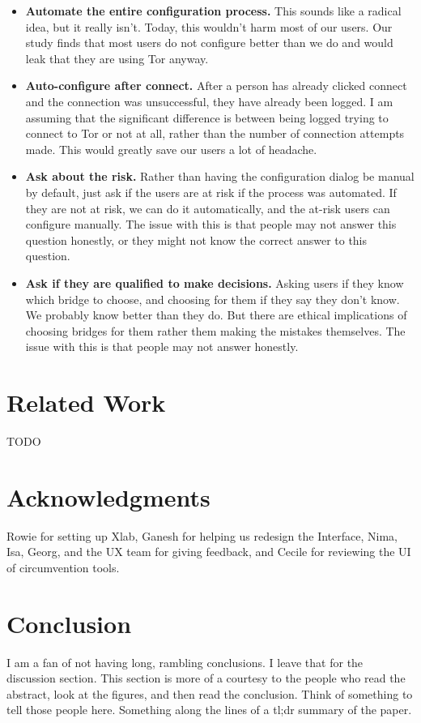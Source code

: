 \documentclass[USenglish,oneside,twocolumn]{article}
\begin{document}
\begin{itemize}
\item{\bfseries Automate the entire configuration process.} This sounds like a radical idea, but it really isn't. Today, this wouldn't harm most of our users. Our study finds that most users do not configure better than we do and would leak that they are using Tor anyway. 
\item {\bfseries Auto-configure after connect.} After a person has already clicked connect and the connection was unsuccessful, they have already been logged. I am assuming that the significant difference is between being logged trying to connect to Tor or not at all, rather than the number of connection attempts made. This would greatly save our users a lot of headache. 
\item{\bfseries Ask about the risk.} Rather than having the configuration dialog be manual by default, just ask if the users are at risk if the process was automated. If they are not at risk, we can do it automatically, and the at-risk users can configure manually. The issue with this is that people may not answer this question honestly, or they might not know the correct answer to this question. 
\item{\bfseries Ask if they are qualified to make decisions.} Asking users if they know which bridge to choose, and choosing for them if they say they don't know. We probably know better than they do. But there are ethical implications of choosing bridges for them rather them making the mistakes themselves. The issue with this is that people may not answer honestly. 
\end{itemize}


\section{Related Work} 
{\color {red} TODO} 

\section {Acknowledgments}
{\color {red} Rowie for setting up Xlab, Ganesh for helping us redesign the Interface, Nima, Isa, Georg, and the UX team for giving feedback, and Cecile for reviewing the UI of circumvention tools.} 


\section{Conclusion} 
{\color {red} I am a fan of not having long, rambling conclusions. I leave
that for the discussion section. This section is more of a courtesy to the 
people who read the abstract, look at the figures, and then read the 
conclusion. Think of something to tell those people here. Something along
the lines of a tl;dr summary of the paper.} 
\end{document}
